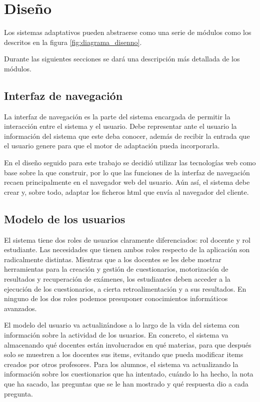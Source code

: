 
\section{Diseño}

Los sistemas adaptativos pueden abstraerse como una serie de módulos como los descritos en la figura \ref{fig:diagrama_disenno}. 

Durante las siguientes secciones se dará una descripción más detallada de los módulos.

\subsection{Interfaz de navegación}

La interfaz de navegación es la parte del sistema encargada de permitir la interacción entre el sistema y el usuario. Debe representar ante el usuario la información del sistema que este deba conocer, además de recibir la entrada que el usuario genere para que el motor de adaptación pueda incorporarla.

En el diseño seguido para este trabajo se decidió utilizar las tecnologías web como base sobre la que construir, por lo que las funciones de la interfaz de navegación recaen principalmente en el navegador web del usuario. Aún así, el sistema debe crear y, sobre todo, adaptar los ficheros html que envía al navegador del cliente.

\subsection{Modelo de los usuarios}


El sistema tiene dos roles de usuarios claramente diferenciados: rol docente y rol estudiante. Las necesidades que tienen ambos roles respecto de la aplicación son radicalmente distintas. Mientras que a los docentes se les debe mostrar herramientas para la creación y gestión de cuestionarios, motorización de resultados y recuperación de exámenes, los estudiantes deben acceder a la ejecución de los cuestionarios, a cierta retroalimentación y a sus resultados. En ninguno de los dos roles podemos presuponer conocimientos informáticos avanzados.%

El modelo del usuario va actualizándose a lo largo de la vida del sistema con información sobre la actividad de los usuarios. En concreto, el sistema va almacenando qué docentes están involucrados en qué materias, para que después solo se muestren a los docentes sus items, evitando que pueda modificar items creados por otros profesores. Para los alumnos, el sistema va actualizando la información sobre los cuestionarios que ha intentado, cuándo lo ha hecho, la nota que ha sacado, las preguntas que se le han mostrado y qué respuesta dio a cada pregunta.

